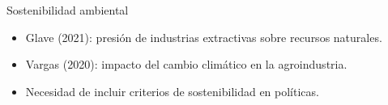 \documentclass[aspectratio=169]{beamer}
\begin{document}
\begin{frame}{\Large  Sostenibilidad ambiental}
    \Large
    \begin{itemize}
        \item Glave (2021): presión de industrias extractivas sobre recursos naturales.
        \item Vargas (2020): impacto del cambio climático en la agroindustria.
        \item Necesidad de incluir criterios de sostenibilidad en políticas.
    \end{itemize}
\end{frame}
\end{document}
